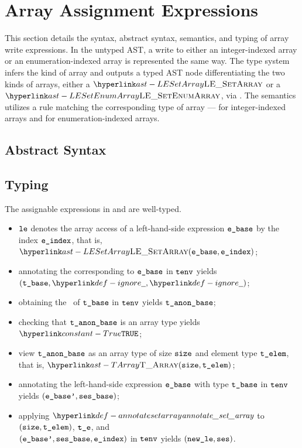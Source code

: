 \hypertarget{def-setarraylexprterm}{}
\section{Array Assignment Expressions\label{sec:ArrayAssignmentExpressions}}
This section details the syntax, abstract syntax, semantics, and typing of array write expressions.
In the untyped AST, a write to either an integer-indexed array or an enumeration-indexed array is represented
the same way. The type system infers the kind of array and outputs a typed AST node differentiating
the two kinds of arrays, either a $\LESetArray$ or a $\LESetEnumArray$, via .
The semantics utilizes a rule matching the corresponding type of array ---
 for integer-indexed arrays and
 for enumeration-indexed arrays.

\subsection{Abstract Syntax}

\subsection{Typing}
The assignable expressions in
 and 
are well-typed.

\ProseParagraph
\AllApply
\begin{itemize}
  \item $\texttt{le}$ denotes the array access of a left-hand-side expression $\texttt{e\_base}$ by the index $\texttt{e\_index}$, that is, $\LESetArray(\ebase, \eindex)$;
  \item annotating the \rhsexpression{} corresponding to $\texttt{e\_base}$ in $\texttt{tenv}$ yields \\ $(\tbase, \Ignore, \Ignore)$\ProseOrTypeError;
  \item obtaining the \underlyingtype\ of $\texttt{t\_base}$ in $\texttt{tenv}$ yields $\texttt{t\_anon\_base}$\ProseOrTypeError;
  \item checking that $\texttt{t\_anon\_base}$ is an array type yields $\True$\ProseOrTypeError;
  \item view $\texttt{t\_anon\_base}$ as an array type of size $\texttt{size}$ and element type $\texttt{t\_elem}$, that is, $\TArray(\size, \telem)$;
  \item annotating the left-hand-side expression $\texttt{e\_base}$ with type $\texttt{t\_base}$ in $\texttt{tenv}$ yields $(\texttt{e\_base'}, \texttt{ses\_base})$\ProseOrTypeError;
  \item applying $\annotatesetarray$ to $(\texttt{size}, \texttt{t\_elem})$, $\texttt{t\_e}$, and \\
        $(\texttt{e\_base'}, \texttt{ses\_base}, \texttt{e\_index})$ in $\texttt{tenv}$ yields $(\texttt{new\_le}, \texttt{ses})$\ProseOrTypeError.
\end{itemize}

